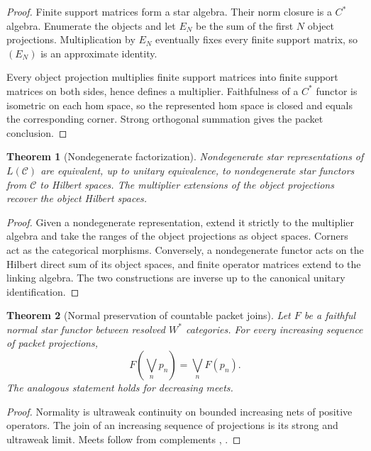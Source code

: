 \documentclass{aomart}
\newtheorem{theorem}{Theorem}[section]
\theoremstyle{definition}
\theoremstyle{remark}
\newcommand{\Ccal}{\mathcal C}
\newcommand{\Rcite}[1]{\cite{#1}}
\begin{document}
\begin{proof}
Finite support matrices form a star algebra. Their norm closure is a \(C^*\) algebra. Enumerate the objects and let \(E_N\) be the sum of the first \(N\) object projections. Multiplication by \(E_N\) eventually fixes every finite support matrix, so \((E_N)\) is an approximate identity.

Every object projection multiplies finite support matrices into finite support matrices on both sides, hence defines a multiplier. Faithfulness of a \(C^*\) functor is isometric on each hom space, so the represented hom space is closed and equals the corresponding corner. Strong orthogonal summation gives the packet conclusion.
\end{proof}

\begin{theorem}[Nondegenerate factorization]\label{thm:nondegenerate_factorization}
Nondegenerate star representations of \(L(\Ccal)\) are equivalent, up to unitary equivalence, to nondegenerate star functors from \(\Ccal\) to Hilbert spaces. The multiplier extensions of the object projections recover the object Hilbert spaces.
\end{theorem}

\begin{proof}
Given a nondegenerate representation, extend it strictly to the multiplier algebra and take the ranges of the object projections as object spaces. Corners act as the categorical morphisms. Conversely, a nondegenerate functor acts on the Hilbert direct sum of its object spaces, and finite operator matrices extend to the linking algebra. The two constructions are inverse up to the canonical unitary identification.
\end{proof}

\begin{theorem}[Normal preservation of countable packet joins]\label{thm:normal_joins}
Let \(F\) be a faithful normal star functor between resolved \(W^*\) categories. For every increasing sequence of packet projections,
\[
 F\left(\bigvee_np_n\right)
 =
 \bigvee_nF(p_n).
\]
The analogous statement holds for decreasing meets.
\end{theorem}

\begin{proof}
Normality is ultraweak continuity on bounded increasing nets of positive operators. The join of an increasing sequence of projections is its strong and ultraweak limit. Meets follow from complements \Rcite{R2}, \Rcite{R8}.
\end{proof}
\end{document}
